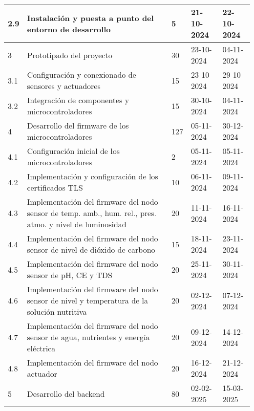 \begin{table}[ht]
\begin{tabularx}{\linewidth}{|p{1cm}|p{10cm}|p{1cm}|p{1.8cm}|p{1.8cm}|}
		2.9  & Instalación y puesta a punto del entorno de desarrollo                                                   & 5     & 21-10-2024 & 22-10-2024 \\ \hline
		3    & Prototipado del proyecto                                                                                 & 30    & 23-10-2024 & 04-11-2024 \\ \hline
		3.1  & Configuración y conexionado de sensores y actuadores                                                     & 15    & 23-10-2024 & 29-10-2024 \\ \hline
		3.2  & Integración de componentes y microcontroladores                                                          & 15    & 30-10-2024 & 04-11-2024 \\ \hline
		4    & Desarrollo del firmware de los microcontroladores                                                        & 127   & 05-11-2024 & 30-12-2024 \\ \hline
		4.1  & Configuración inicial de los microcontroladores                                                          & 2     & 05-11-2024 & 05-11-2024 \\ \hline
		4.2  & Implementación y configuración de los certificados TLS                                                   & 10    & 06-11-2024 & 09-11-2024 \\ \hline
		4.3  & Implementación del firmware del nodo sensor de temp. amb., hum. rel., pres. atmo. y nivel de luminosidad & 20    & 11-11-2024 & 16-11-2024 \\ \hline
		4.4  & Implementación del firmware del nodo sensor de nivel de dióxido de carbono                               & 15    & 18-11-2024 & 23-11-2024 \\ \hline
		4.5  & Implementación del firmware del nodo sensor de pH, CE y TDS                                              & 20    & 25-11-2024 & 30-11-2024 \\ \hline
		4.6  & Implementación del firmware del nodo sensor de nivel y temperatura de la solución nutritiva              & 20    & 02-12-2024 & 07-12-2024 \\ \hline
		4.7  & Implementación del firmware del nodo sensor de agua, nutrientes y energía eléctrica                      & 20    & 09-12-2024 & 14-12-2024 \\ \hline
		4.8  & Implementación del firmware del nodo actuador                                                            & 20    & 16-12-2024 & 21-12-2024 \\ \hline
		5    & Desarrollo del backend                                                                                   & 80    & 02-02-2025 & 15-03-2025 \\ \hline

\end{tabularx}
\end{table}
